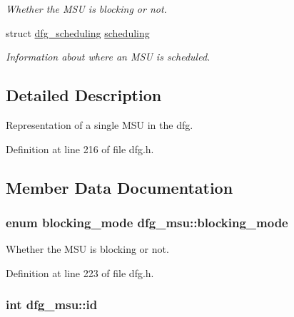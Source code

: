 \begin{DoxyCompactItemize}
\begin{DoxyCompactList}\small\item\em Whether the M\-S\-U is blocking or not. \end{DoxyCompactList}\item 
struct \hyperlink{structdfg__scheduling}{dfg\-\_\-scheduling} \hyperlink{structdfg__msu_a4ca8d344a0d4c4cf72b8a045eb3d3d61}{scheduling}
\begin{DoxyCompactList}\small\item\em Information about where an M\-S\-U is scheduled. \end{DoxyCompactList}\end{DoxyCompactItemize}


\subsection{Detailed Description}
Representation of a single M\-S\-U in the dfg. 

Definition at line 216 of file dfg.\-h.



\subsection{Member Data Documentation}
\hypertarget{structdfg__msu_a9d0a919e5c719537d9d404f0e1de785a}{
\subsubsection[{blocking\-\_\-mode}]{\setlength{\rightskip}{0pt plus 5cm}enum {\bf blocking\-\_\-mode} dfg\-\_\-msu\-::blocking\-\_\-mode}}\label{structdfg__msu_a9d0a919e5c719537d9d404f0e1de785a}


Whether the M\-S\-U is blocking or not. 



Definition at line 223 of file dfg.\-h.

\hypertarget{structdfg__msu_a6ff9496252821697e69b9802f8d96919}{
\subsubsection[{id}]{\setlength{\rightskip}{0pt plus 5cm}int dfg\-\_\-msu\-::id}}\label{structdfg__msu_a6ff9496252821697e69b9802f8d96919}


